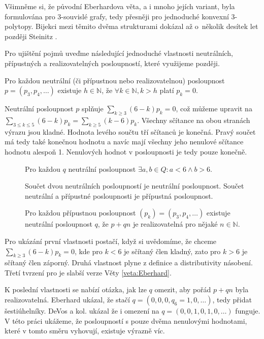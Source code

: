 Všimněme si, že původní Eberhardova věta, a i mnoho jejích variant, byla formulována pro 3-souvislé grafy, tedy přesněji pro jednoduché konvexní 3-polytopy. Bijekci mezi těmito dvěma strukturami dokázal až o~několik desítek let později Steinitz \cite{Steinitz}. 

Pro ujištění pojmů uveďme následující jednoduché vlastnosti neutrálních, přípustných a realizovatelných posloupností, které využijeme později.
\begin{tvrz}
Pro každou neutrální (či přípustnou nebo realizovatelnou) posloupnost $p=(p_3,p_4,\dots)$ existuje $h \in \mathbb{N}$, že $ \forall k \in \mathbb{N}, k>h $ platí $ p_k=0$.
\end{tvrz}

\begin{dukaz}
Neutrální posloupnost $p$ splňuje $\sum_{k \geq 3}{(6-k)p_k}=0$, což můžeme upravit na $\sum_{3 \leq k \leq 5}{(6-k)p_k}=\sum_{k \geq 5}{(k-6)p_k}$. Všechny sčítance na obou stranách výrazu jsou kladné. Hodnota levého součtu tří sčítanců je konečná. Pravý součet má tedy také konečnou hodnotu a navíc mají všechny jeho nenulové sčítance hodnotu alespoň 1. Nenulových hodnot v posloupnosti je tedy pouze konečně. 
\end{dukaz}

\begin{tvrz}\label{veta:posloupnosti}
\begin{description}
\item[] Pro každou $q$ neutrální posloupnost $\exists a,b \in Q : a <6 \wedge b>6$.
\item[] Součet dvou neutrálních posloupností je neutrální posloupnost. Součet neutrální a přípustné posloupnosti je přípustná posloupnost.
\item[] Pro každou přípustnou posloupnost $(p_k) = (p_3,p_4,\dots)$ existuje neutrální posloupnost $q$, že $p+qn$ je realizovatelná pro nějaké $n \in \mathbb{N}$.
\end{description}
\end{tvrz}

\begin{dukaz}
Pro ukázání první vlastnosti postačí, když si uvědomíme, že chceme $\sum_{k \geq 3}{(6-k)p_k} = 0$, kde pro $k < 6$ je sčítaný člen kladný, zato pro $k>6$ je sčítaný člen záporný. Druhá vlastnost plyne z definice a distributivity násobení. Třetí tvrzení pro je slabší verze Věty \ref{veta:Eberhard}.
\end{dukaz}
K poslední vlastnosti se nabízí otázka, jak lze $q$ omezit, aby pořád $p+qn$ byla realizovatelná. Eberhard ukázal, že stačí  $q = (0,0,0,q_6=1,0,\dots)$, tedy přidat šestiúhelníky. DeVos a kol. ukázal že i omezení na  $q = (0,0,1,0,1,0,\dots)$ funguje. V této práci ukážeme, že posloupností s pouze dvěma nenulovými hodnotami, které v tomto směru vyhovují, existuje výrazně víc.



